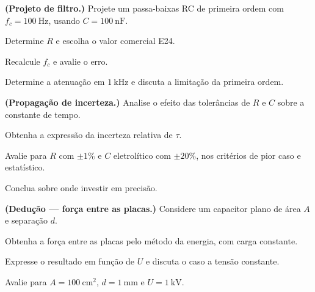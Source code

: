 \begin{questao}[4]{}

\textbf{(Projeto de filtro.)} Projete um passa-baixas RC de primeira ordem com
$f_c=\SI{100}{\hertz}$, usando $C=\SI{100}{\nano\farad}$.
\begin{itensq}
\item Determine $R$ e escolha o valor comercial E24.
\item Recalcule $f_c$ e avalie o erro.
\item Determine a atenuação em $\SI{1}{\kilo\hertz}$ e discuta a limitação da
      primeira ordem.
\end{itensq}


\end{questao}
\begin{questao}[4]{}

\textbf{(Propagação de incerteza.)} Analise o efeito das tolerâncias de $R$ e
$C$ sobre a constante de tempo.
\begin{itensq}
\item Obtenha a expressão da incerteza relativa de $\tau$.
\item Avalie para $R$ com $\pm1\%$ e $C$ eletrolítico com $\pm20\%$, nos
      critérios de pior caso e estatístico.
\item Conclua sobre onde investir em precisão.
\end{itensq}


\end{questao}
\begin{questao}[4]{}

\textbf{(Dedução --- força entre as placas.)} Considere um capacitor plano de
área $A$ e separação $d$.
\begin{itensq}
\item Obtenha a força entre as placas pelo método da energia, com carga
      constante.
\item Expresse o resultado em função de $U$ e discuta o caso a tensão
      constante.
\item Avalie para $A=\SI{100}{\centi\meter\squared}$,
      $d=\SI{1}{\milli\meter}$ e $U=\SI{1}{\kilo\volt}$.
\end{itensq}


\end{questao}
